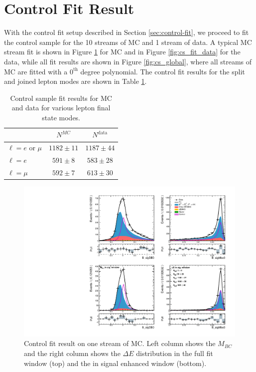 \section{Control Fit Result}
With the control fit setup described in Section \ref{sec:control-fit}, we proceed to fit the control sample for the 10 streams of MC and 1 stream of data. A typical MC stream fit is shown in Figure \ref{fig:cs_fit_mc} for MC and in Figure \ref{fig:cs_fit_data} for the data, while all fit results are shown in Figure \ref{fig:cs_global}, where all streams of MC are fitted with a $0^{\mathrm{th}}$ degree polynomial. The control fit results for the split and joined lepton modes are shown in Table \ref{tab:cs_fit_yield}.
\begin{table}[H]
	\centering
	\begin{tabular}{l|c|c}
		
		& $N^{MC}$ & $N^{\mathrm{data}}$ \\
		\toprule
		$\ell = e$ or $\mu$ & $1182 \pm 11$ & $1187 \pm 44$\\
		$\ell = e$ & $591 \pm 8$ & $583 \pm 28$ \\
		$\ell = \mu$ & $592 \pm 7$ & $613 \pm 30$\\
		\bottomrule
	\end{tabular}
	\captionsetup{width=0.8\linewidth}
	\caption{Control sample fit results for MC and data for various lepton final state modes.}
	\label{tab:cs_fit_yield}
\end{table}

\begin{figure}[H]
	\centering
	\captionsetup{width=0.8\linewidth}
	\includegraphics[width=\linewidth]{fig/cs_fit_mc}
	\caption{Control fit result on one stream of MC. Left column shows the $M_{BC}$ and the right column shows the $\Delta E$ distribution in the full fit window (top) and the in signal enhanced window (bottom).}
	\label{fig:cs_fit_mc}
\end{figure}

